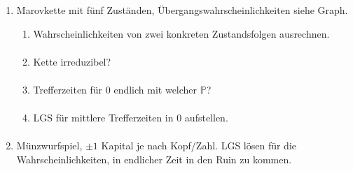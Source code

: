 \documentclass[a4paper,11pt,notitlepage,fullpage]{article}
\newcommand{\p}{\mathbb P}
\begin{document}
\begin{enumerate}
\item Marovkette mit fünf Zuständen, Übergangswahrscheinlichkeiten siehe Graph.
\begin{enumerate}
\item Wahrscheinlichkeiten von zwei konkreten Zustandsfolgen ausrechnen.
\begin{align*}
\end{align*}

\item Kette irreduzibel?
\begin{align*}
\end{align*}

\item Trefferzeiten für $0$ endlich mit welcher $\p$?
\begin{align*}
\end{align*}

\item LGS für mittlere Trefferzeiten in $0$ aufstellen.
\begin{align*}
\end{align*}
\end{enumerate}

\item Münzwurfspiel, $\pm 1$ Kapital je nach Kopf/Zahl. LGS lösen für die Wahrscheinlichkeiten, in endlicher Zeit in den Ruin zu kommen.


\end{enumerate}
\end{document}
